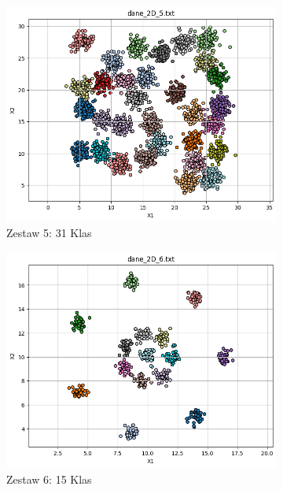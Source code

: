 \documentclass[polish,12pt,a4paper]{extarticle}
\begin{document}
\begin{figure}[h!]
\begin{subfigure}[b]{0.30\textwidth}
        \includegraphics[width=\linewidth]{img/data/dane5.png}
        \captionsetup{labelformat=empty}
        \caption{Zestaw 5: 31 Klas}
    \end{subfigure}
    \hfill
    \begin{subfigure}[b]{0.30\textwidth}
        \includegraphics[width=\linewidth]{img/data/dane6.png}
        \captionsetup{labelformat=empty}
        \caption{Zestaw 6: 15 Klas}
    \end{subfigure}
    \hfill
    \vspace{}
    \begin{subfigure}[b]{0.30\textwidth}

\end{subfigure}
\end{figure}
\end{document}
